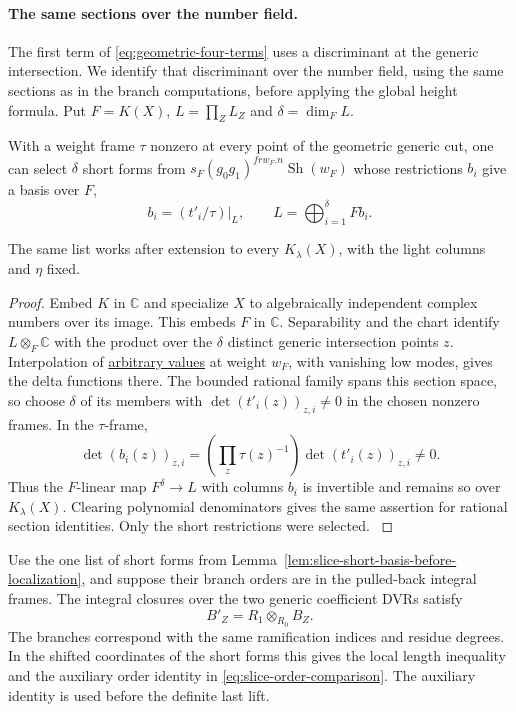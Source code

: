 \paragraph{The same sections over the number field.}
The first term of \eqref{eq:geometric-four-terms} uses a
discriminant at the generic intersection. We identify that
discriminant over the number field, using the same sections
as in the branch computations, before applying the global
height formula.
\hypertarget{source-slice-orders}{}
Put \(F=K(X)\), \(L=\prod_Z L_Z\) and \(\delta=\dim_F L\).

\begin{lemma}
\label{lem:slice-short-basis-before-localization}
With a weight frame \(\tau\) nonzero at every point of the
geometric generic cut,
one can select \(\delta\) short forms from
\(s_F(g_0g_1)^{frw_F.n}\operatorname{Sh}(w_F)\) whose restrictions \(b_i\) give a basis over \(F\),
\[
 b_i=(t'_i/\tau)|_L,\qquad L=\bigoplus_{i=1}^\delta F b_i.
\]

The same list works after extension to every \(K_\lambda(X)\),
with the light columns and \(\eta\) fixed.
\end{lemma}
\begin{proof}
Embed \(K\) in \(\mathbb C\) and specialize \(X\) to algebraically
independent complex numbers over its image. This embeds \(F\) in
\(\mathbb C\). Separability and the chart identify
\(L\otimes_F\mathbb C\) with the product over the \(\delta\) distinct
generic intersection points \(z\). Interpolation of
\hyperref[par:slice-interpolation]{arbitrary values} at weight
\(w_F\), with vanishing low modes, gives the delta functions there.
The bounded rational family spans this section space, so choose
\(\delta\) of its members with \(\det(t'_i(z))_{z,i}\ne0\) in
the chosen nonzero frames. In the \(\tau\)-frame,
\[
 \det(b_i(z))_{z,i}
    =\left(\prod_z\tau(z)^{-1}\right)\det(t'_i(z))_{z,i}\ne0 .
\]
Thus the \(F\)-linear map \(F^\delta\to L\) with columns \(b_i\)
is invertible and remains so over \(K_\lambda(X)\). Clearing
polynomial denominators gives the same assertion for rational
section identities. Only the short restrictions were selected.
\label{cor:slice-orders-1}
\end{proof}

\begin{proposition}\label{prop:slice-completed-branch-comparison}
Use the one list of short forms from
Lemma~\ref{lem:slice-short-basis-before-localization}, and suppose
their branch orders are in the pulled-back integral frames.
The integral closures over the two generic coefficient DVRs satisfy
\[
 B'_Z=R_1\otimes_{R_0} B_Z.
\]
 The branches correspond
with the same ramification indices and residue degrees. In
the shifted coordinates of the short forms this gives
the local length inequality and the auxiliary order identity
in \eqref{eq:slice-order-comparison}. The auxiliary identity
is used before the definite last lift.
\end{proposition}

